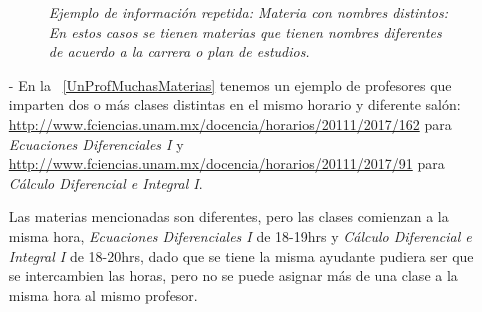 \begin{itemize}
\begin{figure}[H]
	\centering
	\caption[\textit{Ejemplo de información repetida: Materia con nombres distintos}]{\textit{Ejemplo de información repetida: Materia con nombres distintos: En estos casos se tienen materias que tienen nombres diferentes de acuerdo a la carrera o plan de estudios.}}\label{MateriaNombresDistintos}
\end{figure}

\item[-] En la \figurename{~\ref{UnProfMuchasMaterias}} tenemos un ejemplo de profesores que imparten dos o más clases distintas en el mismo horario y diferente salón: \url{http://www.fciencias.unam.mx/docencia/horarios/20111/2017/162} para \textit{Ecuaciones Diferenciales I} y \url{http://www.fciencias.unam.mx/docencia/horarios/20111/2017/91} para \textit{Cálculo Diferencial e Integral I}.
  
Las materias mencionadas son diferentes, pero las clases comienzan a la misma hora, \textit{Ecuaciones Diferenciales I} de 18-19hrs y \textit{Cálculo Diferencial e Integral I} de 18-20hrs, dado que se tiene la misma ayudante pudiera ser que se intercambien las horas, pero no se puede asignar más de una clase a la misma hora al mismo profesor.




\end{itemize}
